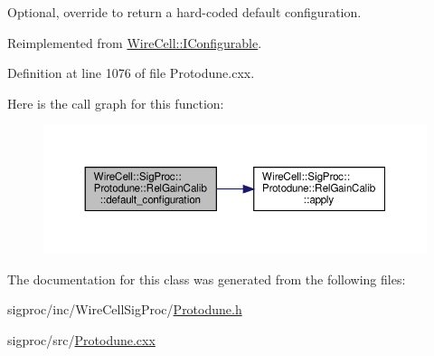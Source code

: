 Optional, override to return a hard-\/coded default configuration. 



Reimplemented from \hyperlink{class_wire_cell_1_1_i_configurable_a54841b2da3d1ea02189478bff96f7998}{Wire\+Cell\+::\+I\+Configurable}.



Definition at line 1076 of file Protodune.\+cxx.

Here is the call graph for this function\+:
\nopagebreak
\begin{figure}[H]
\begin{center}
\leavevmode
\includegraphics[width=350pt]{class_wire_cell_1_1_sig_proc_1_1_protodune_1_1_rel_gain_calib_a6f8513628170ebea7b8741ad12d9f3a1_cgraph}
\end{center}
\end{figure}


The documentation for this class was generated from the following files\+:\begin{DoxyCompactItemize}
\item 
sigproc/inc/\+Wire\+Cell\+Sig\+Proc/\hyperlink{_protodune_8h}{Protodune.\+h}\item 
sigproc/src/\hyperlink{_protodune_8cxx}{Protodune.\+cxx}\end{DoxyCompactItemize}
